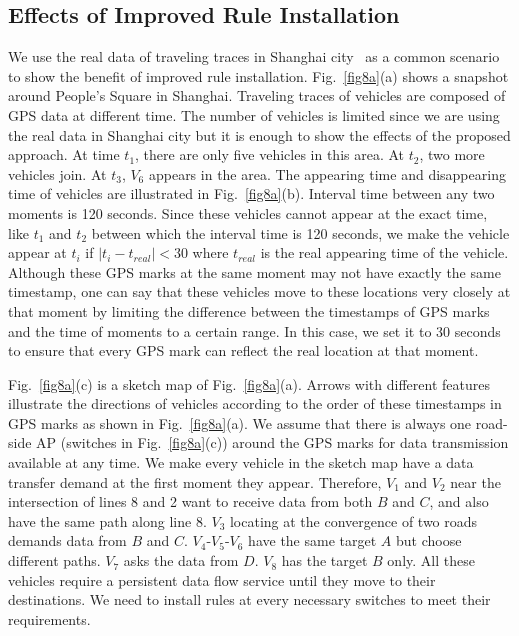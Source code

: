 \documentclass[journal]{IEEEtran}
\begin{document}
\subsection{Effects of Improved Rule Installation}

We use the real data of traveling traces in Shanghai city~\cite{shanghai} as a common scenario to show the benefit of improved rule installation. Fig.~\ref{fig8a}(a) shows a snapshot around People's Square in Shanghai. Traveling traces of vehicles are composed of GPS data at different time. The number of vehicles is limited since we are using the real data in Shanghai city but it is enough to show the effects of the proposed approach. At time $t_{1}$, there are only five vehicles in this area. At $t_{2}$, two more vehicles join. At $t_{3}$, $V_{6}$ appears in the area. The appearing time and disappearing time of vehicles are illustrated in Fig.~\ref{fig8a}(b). Interval time between any two moments is 120 seconds. Since these vehicles cannot appear at the exact time, like $t_{1}$ and $t_{2}$ between which the interval time is 120 seconds, we make the vehicle appear at $t_{i}$ if $|t_{i} - t_{real}| < 30$ where $t_{real}$ is the real appearing time of the vehicle. Although these GPS marks at the same moment may not have exactly the same timestamp, one can say that these vehicles move to these locations very closely at that moment by limiting the difference between the timestamps of GPS marks and the time of moments to a certain range. In this case, we set it to 30 seconds to ensure that every GPS mark can reflect the real location at that moment.

Fig.~\ref{fig8a}(c) is a sketch map of Fig.~\ref{fig8a}(a). Arrows with different features illustrate the directions of vehicles according to the order of these timestamps in GPS marks as shown in Fig.~\ref{fig8a}(a). We assume that there is always one road-side AP (switches in Fig.~\ref{fig8a}(c)) around the GPS marks for data transmission available at any time. We make every vehicle in the sketch map have a data transfer demand at the first moment they appear. Therefore, $V_{1}$ and $V_{2}$ near the intersection of lines 8 and 2 want to receive data from both $B$ and $C$, and also have the same path along line 8. $V_{3}$ locating at the convergence of two roads demands data from $B$ and $C$. $V_{4}$-$V_{5}$-$V_{6}$ have the same target $A$ but choose different paths. $V_{7}$ asks the data from $D$. $V_{8}$ has the target $B$ only. All these vehicles require a persistent data flow service until they move to their destinations. We need to install rules at every necessary switches to meet their requirements.
\end{document}
